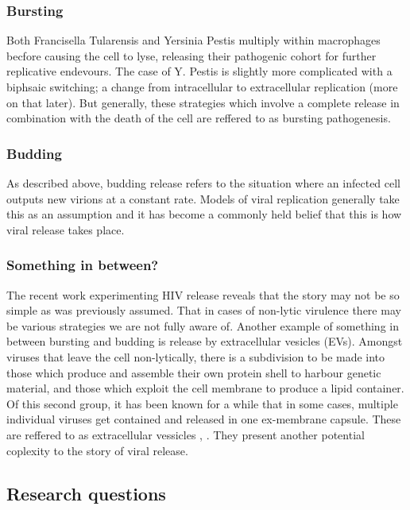 \subsubsection*{Bursting}
Both Francisella Tularensis and Yersinia Pestis multiply within macrophages becfore causing the cell to lyse, releasing their pathogenic cohort for further replicative endevours. The case of Y. Pestis is slightly more complicated with a biphsaic switching; a change from intracellular to extracellular replication (more on that later). But generally, these strategies which involve a complete release in combination with the death of the cell are reffered to as bursting pathogenesis.

\subsubsection*{Budding}

As described above, budding release refers to the situation where an infected cell outputs new virions at a constant rate. Models of viral replication generally take this as an assumption and it has become a commonly held belief that this is how viral release takes place. 


\subsubsection*{Something in between?}

The recent work experimenting HIV release reveals that the story may not be so simple as was previously assumed. That in cases of non-lytic virulence there may be various strategies we are not fully aware of. Another example of something in between bursting and budding is release by extracellular vesicles (EVs). Amongst viruses that leave the cell non-lytically, there is a subdivision to be made into those which produce and assemble their own protein shell to harbour genetic material, and those which exploit the cell membrane to produce a lipid container. Of this second group, it has been known for a while that in some cases, multiple individual viruses get contained and released in one ex-membrane capsule. These are reffered to as extracellular vessicles \cite{kerviel2021new}, \cite{buzas2023roles}. They present another potential coplexity to the story of viral release.









\subsection{Research questions}

